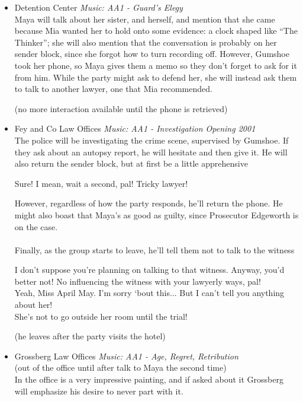 \begin{itemize}
\item Detention Center
\textit{Music: AA1 - Guard's Elegy}\\
Maya will talk about her sister, and herself, and mention that she came because Mia wanted her to hold onto some evidence: a clock shaped like ``The Thinker''; she will also mention that the conversation is probably on her sender block, since she forgot how to turn recording off. However, Gumshoe took her phone, so Maya gives them a memo so they don't forget to ask for it from him. While the party might ask to defend her, she will instead ask them to talk to another lawyer, one that Mia recommended.

(no more interaction available until the phone is retrieved)



\item Fey and Co Law Offices
\textit{Music: AA1 - Investigation Opening 2001}\\
The police will be investigating the crime scene, supervised by Gumshoe. If they ask about an autopsy report, he will hesitate and then give it. He will also return the sender block, but at first be a little apprehensive
\begin{center}
Sure! I mean, wait a second, pal! Tricky lawyer!
\end{center}
However, regardless of how the party responds, he'll return the phone. He might also boast that Maya's as good as guilty, since Prosecutor Edgeworth is on the case. \\
\\
Finally, as the group starts to leave, he'll tell them not to talk to the witness
\begin{center}
I don't suppose you're planning on talking to that witness. Anyway, you'd better not! No influencing the witness with your lawyerly ways, pal!\\
Yeah, Miss April May. I'm sorry `bout this... But I can't tell you anything about her!\\
She's not to go outside her room until the trial!
\end{center}

(he leaves after the party visits the hotel)

\item Grossberg Law Offices
\textit{Music: AA1 - Age, Regret, Retribution}\\
(out of the office until after talk to Maya the second time)\\
In the office is a very impressive painting, and if asked about it Grossberg will emphasize his desire to never part with it.


\end{itemize}
